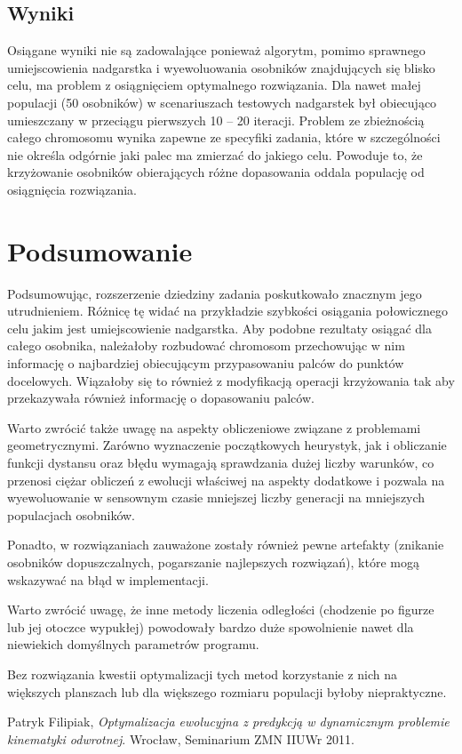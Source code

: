 \documentclass[11pt, leqno]{article}
\begin{document}
\subsection{Wyniki}
Osiągane wyniki nie są zadowalające ponieważ algorytm, pomimo sprawnego umiejscowienia nadgarstka i wyewoluowania osobników znajdujących się blisko celu, ma problem z osiągnięciem optymalnego rozwiązania. Dla nawet małej populacji (50 osobników) w scenariuszach testowych nadgarstek był obiecująco umieszczany w przeciągu pierwszych 10 -- 20 iteracji. Problem ze zbieżnością całego chromosomu wynika zapewne ze specyfiki zadania, które w szczególności nie określa odgórnie jaki palec ma zmierzać do jakiego celu. Powoduje to, że krzyżowanie osobników obierających różne dopasowania oddala populację od osiągnięcia rozwiązania.

\section{Podsumowanie}
Podsumowując, rozszerzenie dziedziny zadania poskutkowało znacznym jego utrudnieniem. Różnicę tę widać na przykładzie szybkości osiągania połowicznego celu jakim jest umiejscowienie nadgarstka. Aby podobne rezultaty osiągać dla całego osobnika, należałoby rozbudować chromosom przechowując w nim informację o najbardziej obiecującym przypasowaniu palców do punktów docelowych. Wiązałoby się to również z modyfikacją operacji krzyżowania tak aby przekazywała również informację o dopasowaniu palców.

Warto zwrócić także uwagę na aspekty obliczeniowe związane z problemami geometrycznymi. Zarówno wyznaczenie początkowych heurystyk, jak i obliczanie funkcji dystansu oraz błędu wymagają sprawdzania dużej liczby warunków, co przenosi ciężar obliczeń z ewolucji właściwej na aspekty dodatkowe i pozwala na wyewoluowanie w sensownym czasie mniejszej liczby generacji na mniejszych populacjach osobników.

Ponadto, w rozwiązaniach zauważone zostały również pewne artefakty (znikanie osobników dopuszczalnych, pogarszanie najlepszych rozwiązań), które mogą wskazywać na błąd w implementacji.

Warto zwrócić uwagę, że inne metody liczenia odległości (chodzenie po figurze lub jej otoczce wypukłej) powodowały bardzo duże spowolnienie nawet dla niewiekich domyślnych parametrów programu.  

Bez rozwiązania kwestii optymalizacji tych metod korzystanie z nich na większych planszach lub dla większego rozmiaru populacji byłoby niepraktyczne.

\begin{thebibliography}{1}
	 Patryk Filipiak, {\it Optymalizacja ewolucyjna z predykcją w dynamicznym problemie kinematyki odwrotnej}. Wrocław, Seminarium ZMN IIUWr 2011.
\end{thebibliography}
\end{document}

